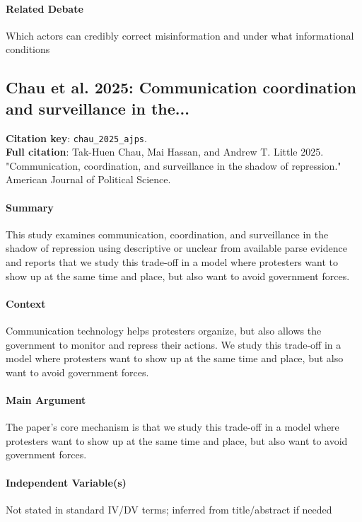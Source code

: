 \documentclass[12pt]{article}
\begin{document}
\paragraph{Related Debate} Which actors can credibly correct misinformation and under what informational conditions


\subsection{Chau et al. 2025: Communication coordination and surveillance in the...}
\textbf{Citation key}: \texttt{chau\_2025\_ajps}.\\
\textbf{Full citation}: Tak-Huen Chau, Mai Hassan, and Andrew T. Little 2025. "Communication, coordination, and surveillance in the shadow of repression." American Journal of Political Science.

\paragraph{Summary} This study examines communication, coordination, and surveillance in the shadow of repression using descriptive or unclear from available parse evidence and reports that we study this trade-off in a model where protesters want to show up at the same time and place, but also want to avoid government forces.

\paragraph{Context} Communication technology helps protesters organize, but also allows the government to monitor and repress their actions. We study this trade-off in a model where protesters want to show up at the same time and place, but also want to avoid government forces.

\paragraph{Main Argument} The paper's core mechanism is that we study this trade-off in a model where protesters want to show up at the same time and place, but also want to avoid government forces.

\paragraph{Independent Variable(s)} Not stated in standard IV/DV terms; inferred from title/abstract if needed
\end{document}

